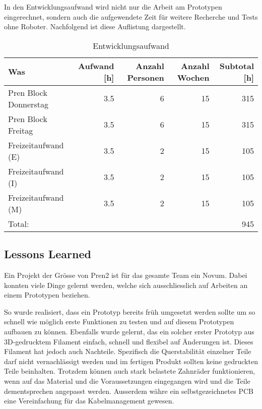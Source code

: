 In den Entwicklungsaufwand wird nicht nur die Arbeit am Prototypen eingerechnet, sondern auch die aufgewendete Zeit für weitere Recherche und Tests ohne Roboter.
Nachfolgend ist diese Auflistung dargestellt.

\begin{center}
\begin{table}[H]
\begin{tabular}{|l|r|r|r|r|}
\hline
\textbf {Was} & \textbf{Aufwand [h]} &
\textbf{Anzahl Personen} & \textbf{Anzahl Wochen} & \textbf{Subtotal [h]}\\
\hline
Pren Block Donnerstag & 3.5 & 6 & 15 & 315 \\
\hline
Pren Block Freitag & 3.5 & 6 & 15 & 315 \\
\hline
Freizeitaufwand (E) & 3.5 & 2 & 15 & 105 \\
\hline
Freizeitaufwand (I) & 3.5 & 2 & 15 & 105 \\
\hline
Freizeitaufwand (M) & 3.5 & 2 & 15 & 105 \\
\hline
Total: & & & & 945 \\ \hline
\end{tabular}
\caption[Entwicklungsaufwand]{Entwicklungsaufwand}
\label{tab:entwicklungsaufwand}
\end{table}
\end{center}

\subsection{Lessons Learned}

Ein Projekt der Grösse von Pren2 ist für das gesamte Team ein Novum. Dabei konnten viele Dinge gelernt werden, welche sich ausschliesslich auf Arbeiten an einem Prototypen beziehen.

So wurde realisiert, dass ein Prototyp bereits früh umgesetzt werden sollte um so schnell wie möglich erste Funktionen zu testen und auf diesem Prototypen aufbauen zu können. Ebenfalls wurde gelernt, das ein solcher erster Prototyp aus 3D-gedrucktem Filament einfach, schnell und flexibel auf Änderungen ist. Dieses Filament hat jedoch auch Nachteile. Spezifisch die Querstabilität einzelner Teile darf nicht vernachlässigt werden und im fertigen Produkt sollten keine gedruckten Teile beinhalten. Trotzdem können auch stark belastete Zahnräder funktionieren, wenn auf das Material und die Voraussetzungen eingegangen wird und die Teile dementsprechen angepasst werden. Ausserdem währe ein selbstgezeichnetes PCB eine Vereinfachung für das Kabelmanagement gewesen. 

